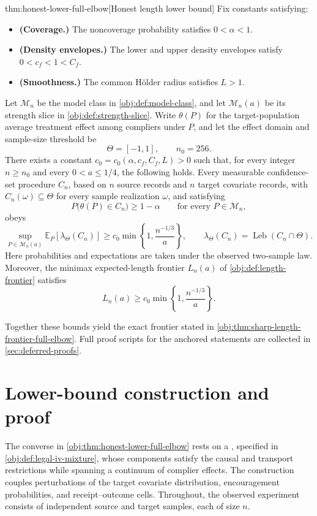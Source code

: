 \documentclass[11pt]{article}
\begin{document}
\begin{theoremv}{thm:honest-lower-full-elbow}[Honest length lower bound]
Fix constants satisfying:
\begin{itemize}
\item \textbf{(Coverage.)} The noncoverage probability satisfies \(0<\alpha<1\).
\item \textbf{(Density envelopes.)} The lower and upper density envelopes satisfy \(0<c_f<1<C_f\).
\item \textbf{(Smoothness.)} The common Hölder radius satisfies \(L>1\).
\end{itemize}
Let \(\mathcal M_n\) be the model class in \cref{obj:def:model-class}, and let \(\mathcal M_n(a)\) be its strength slice in \cref{obj:def:strength-slice}. Write \(\theta(P)\) for the target-population average treatment effect among compliers under \(P\), and let the effect domain and sample-size threshold be
\[
\Theta=[-1,1],
\qquad n_0=256.
\]
There exists a constant \(c_0=c_0(\alpha,c_f,C_f,L)>0\) such that, for every integer \(n\ge n_0\) and every \(0<a\le 1/4\), the following holds. Every measurable confidence-set procedure \(C_n\), based on \(n\) source records and \(n\) target covariate records, with \(C_n(\omega)\subseteq\Theta\) for every sample realization \(\omega\), and satisfying
\[
P\bigl(\theta(P)\in C_n\bigr)\ge 1-\alpha
\qquad\text{for every }P\in\mathcal M_n,
\]
obeys
\[
\sup_{P\in\mathcal M_n(a)}
\mathbb E_P\!\left[\lambda_{\Theta}(C_n)\right]
\ge c_0\min\left\{1,\frac{n^{-1/3}}{a}\right\},
\qquad
\lambda_{\Theta}(C_n)
=\operatorname{Leb}(C_n\cap\Theta).
\]
Here probabilities and expectations are taken under the observed two-sample law. Moreover, the minimax expected-length frontier \(L_n(a)\) of \cref{obj:def:length-frontier} satisfies
\[
L_n(a)\ge c_0\min\left\{1,\frac{n^{-1/3}}{a}\right\}.
\]
\end{theoremv}

Together these bounds yield the exact frontier stated in \cref{obj:thm:sharp-length-frontier-full-elbow}. Full proof scripts for the anchored statements are collected in \cref{sec:deferred-proofs}.



\section{Lower-bound construction and proof}
\label{sec:lower-appendix}

The converse in \cref{obj:thm:honest-lower-full-elbow} rests on a , specified in \cref{obj:def:legal-iv-mixture}, whose components satisfy the causal and transport restrictions while spanning a continuum of complier effects. The construction couples perturbations of the target covariate distribution, encouragement probabilities, and receipt--outcome cells. Throughout, the observed experiment consists of independent source and target samples, each of size \(n\).
\end{document}
